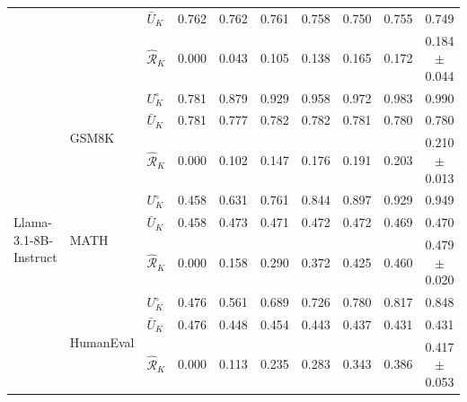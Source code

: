 \begin{table}[t]
\begin{tabular}{lll *{7}{c}}
 &  & $\bar U_K$ & \cellcolor{colAEU!46}0.762 & \cellcolor{colAEU!46}0.762 & \cellcolor{colAEU!46}0.761 & \cellcolor{colAEU!46}0.758 & \cellcolor{colAEU!45}0.750 & \cellcolor{colAEU!45}0.755 & \cellcolor{colAEU!45}0.749 \\
 &  & $\hat{\mathcal R}_K$ & \cellcolor{colRVR!0}0.000 & \cellcolor{colRVR!3}0.043 & \cellcolor{colRVR!6}0.105 & \cellcolor{colRVR!8}0.138 & \cellcolor{colRVR!10}0.165 & \cellcolor{colRVR!10}0.172 & \cellcolor{colRVR!11}0.184 $\pm$ 0.044 \\
\midrule
\multirow{9}{*}{Llama-3.1-8B-Instruct} & \multirow{3}{*}{GSM8K} & $U^\circ_K$ & \cellcolor{colREU!47}0.781 & \cellcolor{colREU!53}0.879 & \cellcolor{colREU!56}0.929 & \cellcolor{colREU!57}0.958 & \cellcolor{colREU!58}0.972 & \cellcolor{colREU!59}0.983 & \cellcolor{colREU!59}0.990 \\
 &  & $\bar U_K$ & \cellcolor{colAEU!47}0.781 & \cellcolor{colAEU!47}0.777 & \cellcolor{colAEU!47}0.782 & \cellcolor{colAEU!47}0.782 & \cellcolor{colAEU!47}0.781 & \cellcolor{colAEU!47}0.780 & \cellcolor{colAEU!47}0.780 \\
 &  & $\hat{\mathcal R}_K$ & \cellcolor{colRVR!0}0.000 & \cellcolor{colRVR!6}0.102 & \cellcolor{colRVR!9}0.147 & \cellcolor{colRVR!11}0.176 & \cellcolor{colRVR!11}0.191 & \cellcolor{colRVR!12}0.203 & \cellcolor{colRVR!13}0.210 $\pm$ 0.013 \\
\cmidrule(l){2-10}
 & \multirow{3}{*}{MATH} & $U^\circ_K$ & \cellcolor{colREU!27}0.458 & \cellcolor{colREU!38}0.631 & \cellcolor{colREU!46}0.761 & \cellcolor{colREU!51}0.844 & \cellcolor{colREU!54}0.897 & \cellcolor{colREU!56}0.929 & \cellcolor{colREU!57}0.949 \\
 &  & $\bar U_K$ & \cellcolor{colAEU!27}0.458 & \cellcolor{colAEU!28}0.473 & \cellcolor{colAEU!28}0.471 & \cellcolor{colAEU!28}0.472 & \cellcolor{colAEU!28}0.472 & \cellcolor{colAEU!28}0.469 & \cellcolor{colAEU!28}0.470 \\
 &  & $\hat{\mathcal R}_K$ & \cellcolor{colRVR!0}0.000 & \cellcolor{colRVR!9}0.158 & \cellcolor{colRVR!17}0.290 & \cellcolor{colRVR!22}0.372 & \cellcolor{colRVR!26}0.425 & \cellcolor{colRVR!28}0.460 & \cellcolor{colRVR!29}0.479 $\pm$ 0.020 \\
\cmidrule(l){2-10}
 & \multirow{3}{*}{HumanEval} & $U^\circ_K$ & \cellcolor{colREU!29}0.476 & \cellcolor{colREU!34}0.561 & \cellcolor{colREU!41}0.689 & \cellcolor{colREU!44}0.726 & \cellcolor{colREU!47}0.780 & \cellcolor{colREU!49}0.817 & \cellcolor{colREU!51}0.848 \\
 &  & $\bar U_K$ & \cellcolor{colAEU!29}0.476 & \cellcolor{colAEU!27}0.448 & \cellcolor{colAEU!27}0.454 & \cellcolor{colAEU!27}0.443 & \cellcolor{colAEU!26}0.437 & \cellcolor{colAEU!26}0.431 & \cellcolor{colAEU!26}0.431 \\
 &  & $\hat{\mathcal R}_K$ & \cellcolor{colRVR!0}0.000 & \cellcolor{colRVR!7}0.113 & \cellcolor{colRVR!14}0.235 & \cellcolor{colRVR!17}0.283 & \cellcolor{colRVR!21}0.343 & \cellcolor{colRVR!23}0.386 & \cellcolor{colRVR!25}0.417 $\pm$ 0.053 \\
\bottomrule
\end{tabular}
\end{table}

